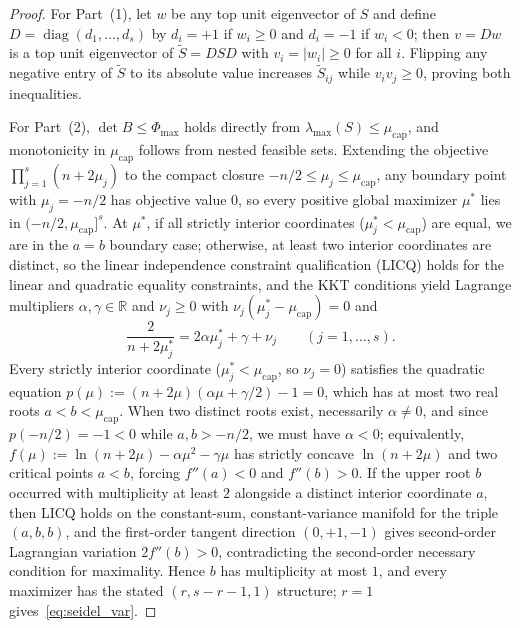 \documentclass[11pt]{article}
\theoremstyle{remark}
\newcommand{\R}{\mathbb{R}}
\begin{document}
\begin{proof}
For Part~(1), let $w$ be any top unit eigenvector of $S$ and define $D = \operatorname{diag}(d_1, \dots, d_s)$ by $d_i = +1$ if $w_i \ge 0$ and $d_i = -1$ if $w_i < 0$; then $v = D w$ is a top unit eigenvector of $\widetilde{S} = D S D$ with $v_i = |w_i| \ge 0$ for all $i$. Flipping any negative entry of $\widetilde{S}$ to its absolute value increases $\widetilde{S}_{ij}$ while $v_i v_j \ge 0$, proving both inequalities.

For Part~(2), $\det B \le \Phi_{\max}$ holds directly from $\lambda_{\max}(S) \le \mu_{\mathrm{cap}}$, and monotonicity in $\mu_{\mathrm{cap}}$ follows from nested feasible sets. Extending the objective $\prod_{j=1}^s (n + 2\mu_j)$ to the compact closure $-n/2 \le \mu_j \le \mu_{\mathrm{cap}}$, any boundary point with $\mu_j = -n/2$ has objective value $0$, so every positive global maximizer $\mu^*$ lies in $(-n/2, \mu_{\mathrm{cap}}]^s$. At $\mu^*$, if all strictly interior coordinates ($\mu_j^* < \mu_{\mathrm{cap}}$) are equal, we are in the $a = b$ boundary case; otherwise, at least two interior coordinates are distinct, so the linear independence constraint qualification (LICQ) holds for the linear and quadratic equality constraints, and the KKT conditions yield Lagrange multipliers $\alpha, \gamma \in \R$ and $\nu_j \ge 0$ with $\nu_j(\mu_j^* - \mu_{\mathrm{cap}}) = 0$ and
\[
  \frac{2}{n + 2\mu_j^*} = 2\alpha \mu_j^* + \gamma + \nu_j \qquad (j = 1, \dots, s).
\]
Every strictly interior coordinate ($\mu_j^* < \mu_{\mathrm{cap}}$, so $\nu_j = 0$) satisfies the quadratic equation $p(\mu) := (n + 2\mu)(\alpha \mu + \gamma/2) - 1 = 0$, which has at most two real roots $a < b < \mu_{\mathrm{cap}}$. When two distinct roots exist, necessarily $\alpha \ne 0$, and since $p(-n/2) = -1 < 0$ while $a, b > -n/2$, we must have $\alpha < 0$; equivalently, $f(\mu) := \ln(n + 2\mu) - \alpha \mu^2 - \gamma\mu$ has strictly concave $\ln(n+2\mu)$ and two critical points $a < b$, forcing $f''(a) < 0$ and $f''(b) > 0$. If the upper root $b$ occurred with multiplicity at least $2$ alongside a distinct interior coordinate $a$, then LICQ holds on the constant-sum, constant-variance manifold for the triple $(a, b, b)$, and the first-order tangent direction $(0, +1, -1)$ gives second-order Lagrangian variation $2 f''(b) > 0$, contradicting the second-order necessary condition for maximality. Hence $b$ has multiplicity at most $1$, and every maximizer has the stated $(r, s-r-1, 1)$ structure; $r = 1$ gives~\eqref{eq:seidel_var}.
\end{proof}
\end{document}
